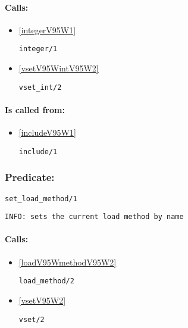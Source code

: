 \paragraph{Calls:} 
\begin{itemize}
\item \ref{integerV95W1} 
\begin{verbatim}
integer/1
\end{verbatim}

\item \ref{vsetV95WintV95W2} 
\begin{verbatim}
vset_int/2
\end{verbatim}

\end{itemize}
\paragraph{Is called from:} 
\begin{itemize}
\item \ref{includeV95W1} 
\begin{verbatim}
include/1
\end{verbatim}

\end{itemize}

\subsubsection{Predicate:} \label{setV95WloadV95WmethodV95W1}

\begin{verbatim}
set_load_method/1
\end{verbatim}

{\small \begin{verbatim}
INFO: sets the current load method by name

\end{verbatim}}
\paragraph{Calls:} 
\begin{itemize}
\item \ref{loadV95WmethodV95W2} 
\begin{verbatim}
load_method/2
\end{verbatim}

\item \ref{vsetV95W2} 
\begin{verbatim}
vset/2
\end{verbatim}

\end{itemize}

